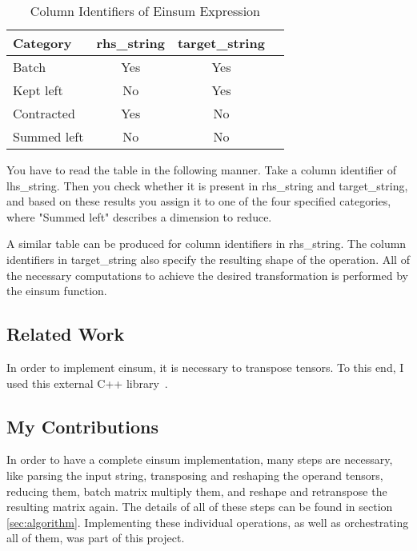 \documentclass[sigconf]{acmart}
\renewcommand{\texttt}[1]{\begingroup\ttfamily\sloppy\hbadness=10000 #1\endgroup}
\begin{document}
\begin{table}[h!]
  \centering
  \caption{Column Identifiers of Einsum Expression}
  \label{tab:column_identifiers}
  \begin{tabular}{lccc}
    \toprule
    \textbf{Category} & \textbf{rhs\_string} & \textbf{target\_string} \\
    \midrule
    Batch              & Yes    & Yes    \\
    Kept left          & No     & Yes    \\
    Contracted         & Yes    & No     \\
    Summed left        & No     & No     \\
    \bottomrule
  \end{tabular}
\end{table}
\noindent
You have to read the table in the following manner. Take a column identifier of \texttt{lhs\_string}. Then you check whether it is present in \texttt{rhs\_string} and \texttt{target\_string}, and based on these results you assign it to one of the four specified categories, where "Summed left" describes a dimension to reduce.

A similar table can be produced for column identifiers in \texttt{rhs\_string}. The column identifiers in \texttt{target\_string} also specify the resulting shape of the operation. All of the necessary computations to achieve the desired transformation is performed by the einsum function.

\subsection{Related Work}
In order to implement einsum, it is necessary to transpose tensors. To this end, I used {this external C++ library}~\cite{hptt2017}.

\subsection{My Contributions}
In order to have a complete einsum implementation, many steps are necessary, like parsing the input string, transposing and reshaping the operand tensors, reducing them, batch matrix multiply them, and reshape and retranspose the resulting matrix again. The details of all of these steps can be found in section \ref{sec:algorithm}. Implementing these individual operations, as well as orchestrating all of them, was part of this project.
\end{document}
